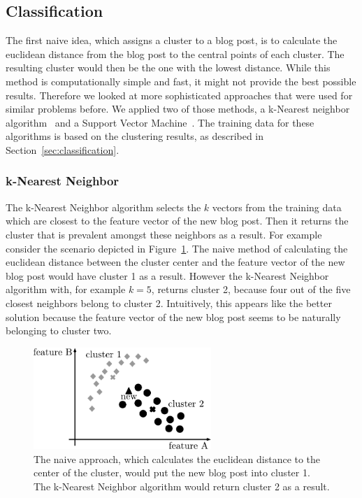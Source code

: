 \subsection{Classification}
\label{sec:impl_classification}


The first naive idea, which assigns a cluster to a blog post, is to calculate the euclidean distance from the blog post to the central points of each cluster.
The resulting cluster would then be the one with the lowest distance.
While this method is computationally simple and fast, it might not provide the best possible results.
Therefore we looked at more sophisticated approaches that were used for similar problems before.
We applied two of those methods, a k-Nearest neighbor algorithm~\cite{peterson2009k} and a Support Vector Machine~\cite{kolari2006svms}.
The training data for these algorithms is based on the clustering results, as described in Section~\ref{sec:classification}.


\subsubsection{k-Nearest Neighbor}
\label{sec:k_nearest_neighbor}


The k-Nearest Neighbor algorithm selects the $k$ vectors from the training data which are closest to the feature vector of the new blog post.
Then it returns the cluster that is prevalent amongst these neighbors as a result.
For example consider the scenario depicted in Figure~\ref{fig:naive}.
The naive method of calculating the euclidean distance between the cluster center and the feature vector of the new blog post would have cluster 1 as a result.
However the k-Nearest Neighbor algorithm with, for example $k=5$, returns cluster 2, because four out of the five closest neighbors belong to cluster 2.
Intuitively, this appears like the better solution because the feature vector of the new blog post seems to be naturally belonging to cluster two.


\begin{figure}[h]
    \centering
    \includegraphics[width=0.6\textwidth]{images/naive.pdf}
    \caption{The naive approach, which calculates the euclidean distance to the center of the cluster, would put the new blog post into cluster 1. The k-Nearest Neighbor algorithm would return cluster 2 as a result.}
    \label{fig:naive}
\end{figure}


